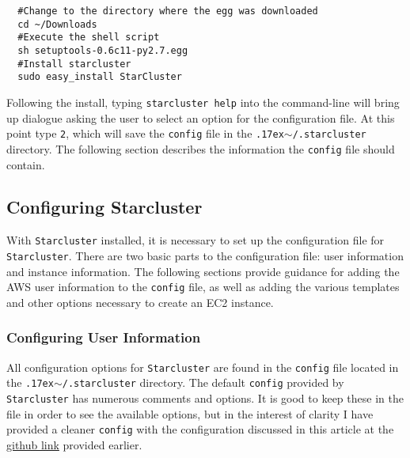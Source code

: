\documentclass[12pt, letterpaper]{article}
\newcommand{\ntilde}{{\raise.17ex\hbox{$\scriptstyle\sim$}}}
\begin{document}
\begin{verbatim}
  #Change to the directory where the egg was downloaded
  cd ~/Downloads
  #Execute the shell script
  sh setuptools-0.6c11-py2.7.egg
  #Install starcluster
  sudo easy_install StarCluster
\end{verbatim}

\noindent
Following the install, typing \texttt{starcluster help} into the command-line will bring up dialogue asking the 
user to select an option for the configuration file. At this point type \texttt{2}, which will save the \texttt{config} 
file in the \texttt{\ntilde/.starcluster} directory. The following section describes the information the \texttt{config}
file should contain. 

\subsection*{Configuring Starcluster}

With \texttt{Starcluster} installed, it is necessary to set up the configuration file for \texttt{Starcluster}. There
are two basic parts to the configuration file: user information and instance information. The following sections 
provide guidance for adding the AWS user information to the \texttt{config} file, as well as adding the various 
templates and other options necessary to create an EC2 instance. 

\subsubsection*{Configuring User Information}

All configuration options for \texttt{Starcluster} are found in the \texttt{config} 
file located in the \texttt{\ntilde/.starcluster} directory. The 
default \texttt{config} provided by \texttt{Starcluster} has numerous comments 
and options. It is good to keep these in the file in order to see the available options, 
but in the interest of clarity I have provided a cleaner \texttt{config} 
with the configuration discussed in this article at the \href{https://github.com/johnb30/polmeth_ec2}{github link} provided earlier. 
\end{document}
